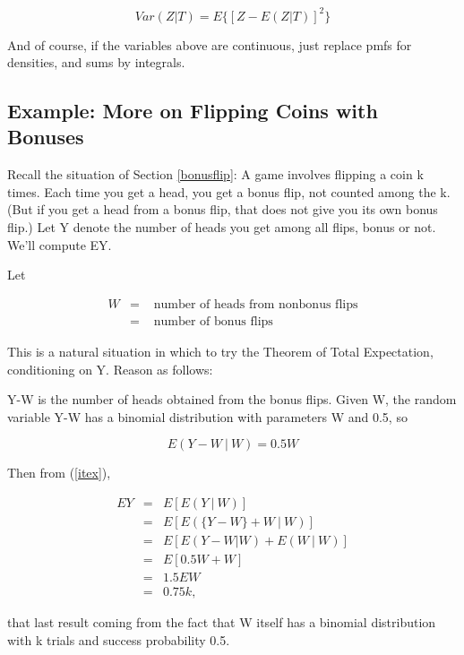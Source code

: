 \documentclass[11pt]{article}
\begin{document}
\begin{equation}
Var(Z | T) = E\{[Z - E(Z|T)]^2\}
\end{equation}

And of course, if the variables above are continuous, just replace pmfs
for densities, and sums by integrals.

\subsection{Example:  More on Flipping Coins with Bonuses}

Recall the situation of Section \ref{bonusflip}:  A game involves
flipping a coin k times.  Each time you get a head, you get a bonus
flip, not counted among the k.  (But if you get a head from a bonus
flip, that does not give you its own bonus flip.) Let Y denote the
number of heads you get among all flips, bonus or not.   We'll compute
EY.

Let

\begin{eqnarray}
W &=& \textrm{ number of heads from nonbonus flips} \\ 
  &=& \textrm{ number of bonus flips} 
\end{eqnarray}

This is a natural situation in which to try the Theorem of Total
Expectation, conditioning on Y.  Reason as follows:

Y-W is the number of heads obtained from the bonus flips.  Given W, the
random variable Y-W has a binomial distribution with parameters W and
0.5, so 

\begin{equation}
E(Y-W ~|~ W) = 0.5 W
\end{equation}

Then from (\ref{itex}),

\begin{eqnarray}
EY &=& E[E(Y ~|~ W)] \\ 
&=& E \left [E ( \{ Y-W \} + W ~|~ W ) \right ] \\
&=& E \left [E (Y-W | W) + E(W ~|~ W ) \right ] \\
&=& E \left [ 0.5W + W \right ] \\
&=& 1.5 EW \\
&=& 0.75 k,
\end{eqnarray}

that last result coming from the fact that W itself has a binomial
distribution with k trials and success probability 0.5.
\end{document}
